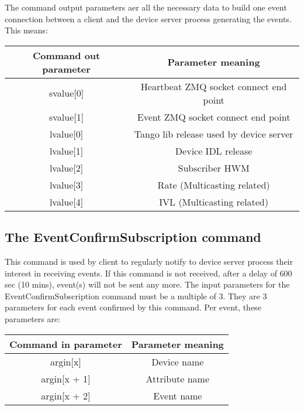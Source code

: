 \vspace{0.3cm}

The command output parameters aer all the necessary data to build
one event connection between a client and the device server process
generating the events. This means:\vspace{0.3cm}

\begin{center}
\begin{longtable}{|c|c|}
\hline 
Command out parameter & Parameter meaning\tabularnewline
\hline 
\hline 
svalue{[}0{]} & Heartbeat ZMQ socket connect end point\tabularnewline
\hline 
svalue{[}1{]} & Event ZMQ socket connect end point\tabularnewline
\hline 
lvalue{[}0{]} & Tango lib release used by device server\tabularnewline
\hline 
lvalue{[}1{]} & Device IDL release\tabularnewline
\hline 
lvalue{[}2{]} & Subscriber HWM\tabularnewline
\hline 
lvalue{[}3{]} & Rate (Multicasting related)\tabularnewline
\hline 
lvalue{[}4{]} & IVL (Multicasting related)\tabularnewline
\hline 
\end{longtable}
\par\end{center}

\vspace{0.3cm}


\subsection{The EventConfirmSubscription command}

This command is used by client to regularly notify to device server
process their interest in receiving events. If this command is not
received, after a delay of 600 sec (10 mins), event(s) will not be
sent any more. The input parameters for the EventConfirmSubscription
command must be a multiple of 3. They are 3 parameters for each event
confirmed by this command. Per event, these parameters are:

\vspace{0.3cm}

\begin{center}
\begin{longtable}{|c|c|}
\hline 
Command in parameter & Parameter meaning\tabularnewline
\hline 
\hline 
argin{[}x{]} & Device name\tabularnewline
\hline 
argin{[}x + 1{]} & Attribute name\tabularnewline
\hline 
argin{[}x + 2{]} & Event name\tabularnewline
\hline 
\end{longtable}
\par\end{center}

